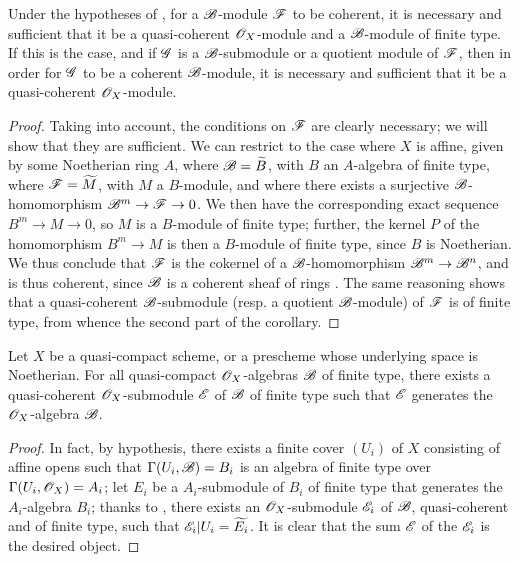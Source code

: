 \begin{corollary}[9.6.4]
\label{I.9.6.4}
Under the hypotheses of , for a $\mathscr{B}$-module $\mathscr{F}$ to be coherent, it is necessary and sufficient that it be a quasi-coherent $\mathscr{O}_X$-module and a $\mathscr{B}$-module of finite type.
If this is the case, and if $\mathscr{G}$ is a $\mathscr{B}$-submodule or a quotient module of $\mathscr{F}$, then in order for $\mathscr{G}$ to be a coherent $\mathscr{B}$-module, it is necessary and sufficient that it be a quasi-coherent $\mathscr{O}_X$-module.
\end{corollary}

\begin{proof}
Taking  into account, the conditions on $\mathscr{F}$ are clearly necessary; we will show that they are sufficient.
We can restrict to the case where $X$ is affine, given by some Noetherian ring $A$, where $\mathscr{B}=\widetilde{B}$, with $B$ an $A$-algebra of finite type, where $\mathscr{F}=\widetilde{M}$, with $M$ a $B$-module, and where there exists a surjective $\mathscr{B}$-homomorphism $\sh{B}^m\to\sh{F}\to0$.
We then have the corresponding exact sequence $B^m\to M\to0$, so $M$ is a $B$-module of finite type; further, the kernel $P$ of the homomorphism $B^m\to M$ is then a $B$-module of finite type, since $B$ is Noetherian.
We thus conclude  that $\mathscr{F}$ is the cokernel of a $\mathscr{B}$-homomorphism $\sh{B}^m\to\sh{B}^n$, and is thus coherent, since $\mathscr{B}$ is a coherent sheaf of rings .
The same reasoning shows that a quasi-coherent $\mathscr{B}$-submodule (resp. a quotient $\mathscr{B}$-module) of $\mathscr{F}$ is of finite type, from whence the second part of the corollary.
\end{proof}

\begin{proposition}[9.6.5]
\label{I.9.6.5}
Let $X$ be a quasi-compact scheme, or a prescheme whose underlying space is Noetherian.
For all quasi-compact $\mathscr{O}_X$-algebras $\mathscr{B}$ of finite type, there exists a quasi-coherent $\mathscr{O}_X$-submodule $\mathscr{E}$ of $\mathscr{B}$ of finite type such that $\mathscr{E}$ generates  the $\mathscr{O}_X$-algebra $\mathscr{B}$.
\end{proposition}

\begin{proof}
In fact, by hypothesis, there exists a finite cover $(U_i)$ of $X$ consisting of affine opens such that $\Gamma(U_i,\mathscr{B})=B_i$ is an algebra of finite type over $\Gamma(U_i,\mathscr{O}_X)=A_i$; let $E_i$ be a $A_i$-submodule of $B_i$ of finite type that generates the $A_i$-algebra $B_i$; thanks to , there exists an $\mathscr{O}_X$-submodule $\mathscr{E}_i$ of $\mathscr{B}$, quasi-coherent and of finite type, such that $\mathscr{E}_i|U_i=\widetilde{E_i}$.
It is clear that the sum $\mathscr{E}$ of the $\mathscr{E}_i$ is the desired object.
\end{proof}

